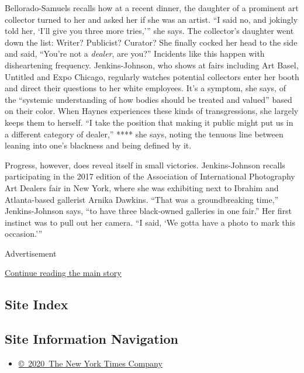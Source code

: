 Bellorado-Samuels recalls how at a recent dinner, the daughter of a
prominent art collector turned to her and asked her if she was an
artist. ``I said no, and jokingly told her, `I'll give you three more
tries,''' she says. The collector's daughter went down the list: Writer?
Publicist? Curator? She finally cocked her head to the side and said,
``You're not a \emph{dealer}, are you?'' Incidents like this happen with
disheartening frequency. Jenkins-Johnson, who shows at fairs including
Art Basel, Untitled and Expo Chicago, regularly watches potential
collectors enter her booth and direct their questions to her white
employees. It's a symptom, she says, of the ``systemic understanding of
how bodies should be treated and valued'' based on their color. When
Haynes experiences these kinds of transgressions, she largely keeps them
to herself. ``I take the position that making it public might put us in
a different category of dealer,'' **** she says, noting the tenuous line
between leaning into one's blackness and being defined by it.

Progress, however, does reveal itself in small victories.
Jenkins-Johnson recalls participating in the 2017 edition of the
Association of International Photography Art Dealers fair in New York,
where she was exhibiting next to Ibrahim and Atlanta-based gallerist
Arnika Dawkins. ``That was a groundbreaking time,'' Jenkins-Johnson
says, ``to have three black-owned galleries in one fair.'' Her first
instinct was to pull out her camera. ``I said, `We gotta have a photo to
mark this occasion.'''

Advertisement

\protect\hyperlink{after-bottom}{Continue reading the main story}

\hypertarget{site-index}{%
\subsection{Site Index}\label{site-index}}

\hypertarget{site-information-navigation}{%
\subsection{Site Information
Navigation}\label{site-information-navigation}}

\begin{itemize}
\tightlist
\item
  \href{https://help.nytimes.com/hc/en-us/articles/115014792127-Copyright-notice}{©~2020~The
  New York Times Company}
\end{itemize}

